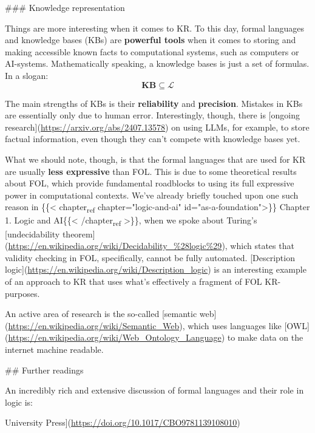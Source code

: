 \documentclass[11pt]{article}
\begin{document}
\#\#\# Knowledge representation

Things are more interesting when it comes to KR. To this day, formal languages
and knowledge bases (KBs) are \textbf{\textbf{powerful tools}} when it comes to storing and
making accessible known facts to computational systems, such as computers or
AI-systems. Mathematically speaking, a knowledge bases is just a set of
formulas. In a slogan: $$\mathbf{KB}\subseteq \mathcal{L}$$ 

The main strengths of KBs is their \textbf{\textbf{reliability}} and \textbf{\textbf{precision}}. Mistakes
in KBs are essentially only due to human error. Interestingly, though, there is
[ongoing research](\url{https://arxiv.org/abs/2407.13578}) on using LLMs, for example,
to store factual information, even though they can't compete with knowledge
bases yet.

What we should note, though, is that the formal languages that are used for KR
are usually \textbf{\textbf{less expressive}} than FOL. This is due to some theoretical
results about FOL, which provide fundamental roadblocks to using its full
expressive power in computational contexts. We've already briefly touched upon
one such reason in \{\{< chapter\textsubscript{ref} chapter="logic-and-ai"
id="as-a-foundation">\}\} Chapter 1. Logic and AI\{\{< /chapter\textsubscript{ref} >\}\}, when we
spoke about Turing's [undecidability
theorem](\url{https://en.wikipedia.org/wiki/Decidability\_\%28logic\%29}), which states
that validity checking in FOL, specifically, cannot be fully automated.
[Description logic](\url{https://en.wikipedia.org/wiki/Description\_logic}) is an
interesting example of an approach to KR that uses what's effectively a fragment
of FOL KR-purposes.

An active area of research is the so-called [semantic
web](\url{https://en.wikipedia.org/wiki/Semantic\_Web}), which uses languages like
[OWL](\url{https://en.wikipedia.org/wiki/Web\_Ontology\_Language}) to make data on the
internet machine readable. 

\#\# Further readings

An incredibly rich and extensive discussion of formal languages and their role
in logic is:

\begin{itemize}
\item{}(\url{https://doi.org/10.1017/CBO9781139108010})
\end{document}
